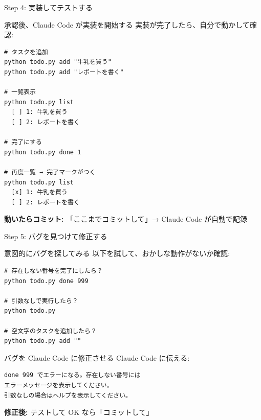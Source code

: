 \documentclass[aspectratio=169, 14pt]{beamer}
\begin{document}
\begin{frame}[fragile]{Step 4: 実装してテストする}
  \begin{block}{承認後、Claude Code が実装を開始する}
    {\small 実装が完了したら、自分で動かして確認:}
  \end{block}

  \begin{lstlisting}[language={}, numbers=none]
# タスクを追加
python todo.py add "牛乳を買う"
python todo.py add "レポートを書く"

# 一覧表示
python todo.py list
  [ ] 1: 牛乳を買う
  [ ] 2: レポートを書く

# 完了にする
python todo.py done 1

# 再度一覧 → 完了マークがつく
python todo.py list
  [x] 1: 牛乳を買う
  [ ] 2: レポートを書く
  \end{lstlisting}

  {\scriptsize \textbf{動いたらコミット:} 「ここまでコミットして」→ Claude Code が自動で記録}
\end{frame}

\begin{frame}[fragile]{Step 5: バグを見つけて修正する}
  \begin{alertblock}{意図的にバグを探してみる}
    {\small 以下を試して、おかしな動作がないか確認:}
  \end{alertblock}

  \begin{lstlisting}[language={}, numbers=none]
# 存在しない番号を完了にしたら？
python todo.py done 999

# 引数なしで実行したら？
python todo.py

# 空文字のタスクを追加したら？
python todo.py add ""
  \end{lstlisting}

  \begin{exampleblock}{バグを Claude Code に修正させる}
    {\small Claude Code に伝える:}

    \begin{lstlisting}[language={}, numbers=none]
done 999 でエラーになる。存在しない番号には
エラーメッセージを表示してください。
引数なしの場合はヘルプを表示してください。
    \end{lstlisting}
  \end{exampleblock}

  {\scriptsize \textbf{修正後:} テストして OK なら「コミットして」}
\end{frame}
\end{document}
